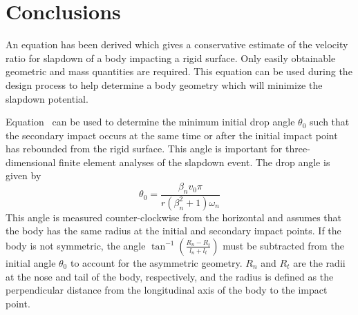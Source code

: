 \section{Conclusions}

An equation has been derived which gives a conservative estimate of
the velocity ratio for slapdown of a body impacting a rigid surface.
Only easily obtainable geometric and mass quantities are required.
This equation can be used during the design process to help determine
a body geometry which will minimize the slapdown potential. 


Equation~ can be used to determine the minimum initial drop
angle $\theta_0$ such that the secondary impact occurs at the same
time or after the initial impact point has rebounded from the rigid
surface. This angle is important for three-dimensional finite element
analyses of the slapdown event.  The drop angle is given by
\begin{equation}
\theta_0 = \frac{\beta_n v_0\pi}{r(\beta_n^2+1)\omega_n} 
\end{equation}
This angle is measured counter-clockwise from the horizontal and
assumes that the body has the same radius at the initial and secondary
impact points.  If the body is not symmetric, the angle
$\tan^{-1}\left(\frac{R_n-R_t}{l_n+l_t}\right)$ must be subtracted
from the initial angle $\theta_0$ to account for the asymmetric
geometry. $R_n$ and $R_t$ are the radii at the nose and tail of the
body, respectively, and the radius is defined as the perpendicular
distance from the longitudinal axis of the body to the impact point. 

